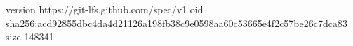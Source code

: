 version https://git-lfs.github.com/spec/v1
oid sha256:acd92855dbc4da4d21126a198fb38c9e0598aa60c53665e4f2c57be26c7dca83
size 148341
